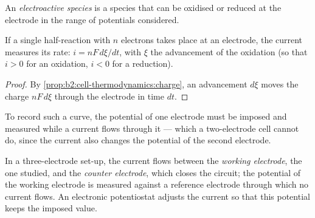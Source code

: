 \begin{definition}\label{def:b2:current-potential-curves:electroactive}
An \emph{electroactive species} is a species
that can be oxidised or reduced at the electrode in the range of potentials
considered.
\end{definition}

\begin{proposition}\label{prop:b2:current-potential-curves:current-rate}
If a single half-reaction with $n$ electrons takes place at an electrode, the
current measures its rate: $i = nF\,d\xi/dt$, with $\xi$ the advancement of
the oxidation (so that $i > 0$ for an oxidation, $i < 0$ for a reduction).
\end{proposition}

\begin{proof}
By \cref{prop:b2:cell-thermodynamics:charge}, an advancement $d\xi$ moves the
charge $nF\,d\xi$ through the electrode in time $dt$.
\end{proof}

To record such a curve, the potential of one electrode must be imposed and
measured while a current flows through it --- which a two-electrode cell
cannot do, since the current also changes the potential of the second
electrode.

\begin{definition}\label{def:b2:current-potential-curves:set-up}
In a three-electrode set-up, the current flows between the \emph{working
electrode}, the one studied, and the \emph{counter electrode},
which closes the circuit; the potential
of the working electrode is measured against a reference electrode through
which no current flows. An electronic potentiostat adjusts the current so
that this potential keeps the imposed value.
\end{definition}

